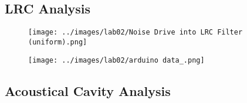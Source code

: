 \documentclass[12pt]{article}
\begin{document}
\subsection{LRC Analysis}

\begin{figure}
\centering
    \texttt{[image: ../images/lab02/Noise Drive into LRC Filter (uniform).png]}
    \caption{}
    \label{fig:LRC fft}
\end{figure} %

\begin{figure}
\centering
    \texttt{[image: ../images/lab02/arduino data\_.png]}
    \caption{}
    \label{fig:LRC Arduino}
\end{figure} %

\subsection{Acoustical Cavity Analysis}


\end{document}
